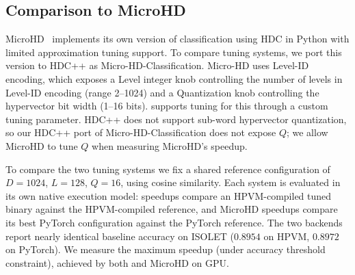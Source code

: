 \subsection{Comparison to MicroHD}
MicroHD~\cite{microhd-github} implements its own version of classification using HDC in Python with limited approximation tuning support. To compare tuning systems, we port this version to HDC++ as Micro-HD-Classification. Micro-HD uses Level-ID encoding, which exposes a Level integer knob controlling the number of levels in Level-ID encoding (range 2--1024) and a Quantization knob controlling the hypervector bit width (1--16 bits). %
\pname{} supports tuning for this through a custom tuning parameter. HDC++ does not support sub-word hypervector quantization, so our HDC++ port of Micro-HD-Classification does not expose $Q$; we allow MicroHD to tune $Q$ when measuring MicroHD's speedup.

To compare the two tuning systems we fix a shared reference configuration of $D{=}1024$, $L{=}128$, $Q{=}16$, using cosine similarity. Each system is evaluated in its own native execution model: \pname{} speedups compare an HPVM-compiled tuned binary against the HPVM-compiled reference, and MicroHD speedups compare its best PyTorch configuration against the PyTorch reference. The two backends report nearly identical baseline accuracy on ISOLET ($0.8954$ on HPVM, $0.8972$ on PyTorch).
 We measure the maximum speedup (under accuracy threshold constraint), achieved by both \pname{} and MicroHD on GPU.
 



